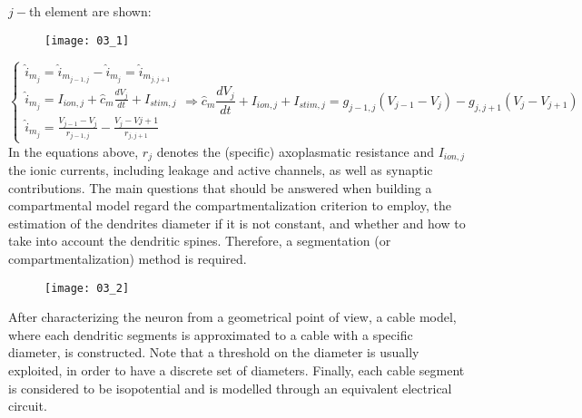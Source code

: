\(j-\)th element are shown:
\begin{figure}[H]
    \texttt{[image: 03\_1]}
    \centering
\end{figure}
\begin{equation*}
    \begin{cases}
        \hat{i}_{m_{j}}=\hat{i}_{m_{j-1,j}}-\hat{i}_{m_{j}}=\hat{i}_{m_{j,j+1}} \\
        \hat{i}_{m_{j}}=I_{ion,j}+\hat{c}_{m}\frac{dV_{j}}{dt}+I_{stim,j}       \\
        \hat{i}_{m_{j}}=\frac{V_{j-1}-V_{j}}{r_{j-1,j}}-\frac{V_{j}-V{j+1}}{r_{j,j+1}}
    \end{cases}
    \Rightarrow
    \hat{c}_{m}\frac{dV_{j}}{dt}+I_{ion,j}+I_{stim,j}=g_{j-1,j}(V_{j-1}-V_{j})-g_{j,j+1}(V_{j}-V_{j+1})
\end{equation*}
In the equations above, \(r_{j}\) denotes the (specific) axoplasmatic resistance and \(I_{ion,j}\)
the ionic currents, including leakage and active channels, as well as synaptic contributions.
The main questions that should be answered when building a compartmental model regard the
compartmentalization criterion to employ, the estimation of the dendrites diameter if it is
not constant, and whether and how to take into account the dendritic spines. Therefore,
a segmentation (or compartmentalization) method is required.
\begin{figure}[H]
    \texttt{[image: 03\_2]}
    \centering
\end{figure}
After characterizing the neuron from a geometrical point of view, a cable model, where
each dendritic segments is approximated to a cable with a specific diameter, is constructed.
Note that a threshold on the diameter is usually exploited, in order to have a discrete
set of diameters. Finally, each cable segment is considered to be isopotential and is modelled
through an equivalent electrical circuit.

